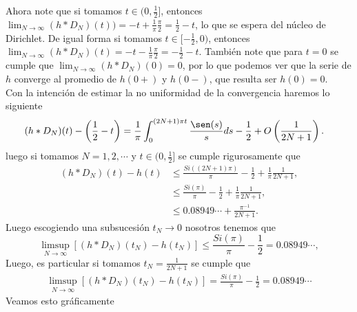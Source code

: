 Ahora note que si tomamos $t\in(0,\frac{1}{2}]$, entonces $\lim_{N \to \infty}(h*D_N)(t))=-t+\frac{1}{\pi}\frac{\pi}{2}=\frac{1}{2}-t$, lo que se espera del núcleo de Dirichlet. De igual forma si tomamos $t\in[-\frac{1}{2},0)$, entonces $\lim_{N \to \infty}(h*D_N)(t)=-t-\frac{1}{\pi}\frac{\pi}{2}=-\frac{1}{2}-t$. También note que para $t=0$ se cumple que $\lim_{N \to \infty}(h*D_{N})(0)=0$, por lo que podemos ver que la serie de $h$ converge al promedio de $h(0+)$ y $h(0-)$, que resulta ser $h(0)=0$.\\
Con la intención de estimar la no uniformidad de la convergencia haremos lo siguiente
\begin{align*}
  (h*D_N)(t)-\left( \frac{1}{2}-t \right)&=\frac{1}{\pi}\int_{0}^{(2N+1)\pi t}\frac{\sen(s)}{s}ds-\frac{1}{2}+O\left( \frac{1}{2N+1} \right).
\end{align*}
luego si tomamos $N=1,2,\cdots$ y $t\in (0,\frac{1}{2}]$ se cumple rigurosamente que 
\begin{align*}
  (h*D_N)(t)-h(t)&\leq \frac{Si((2N+1)\pi)}{\pi}-\frac{1}{2}+\frac{1}{\pi}\frac{1}{2N+1},\\
  &\leq \frac{Si(\pi)}{\pi}-\frac{1}{2}+\frac{1}{\pi}\frac{1}{2N+1},\\
  &\leq 0.08949\cdots+\frac{\pi^{-1}}{2N+1}.
\end{align*}
Luego escogiendo una subsucesión $t_N\to 0$ nosotros tenemos que
\begin{equation}\label{eq:cota}
  \limsup_{N\to\infty}\left[ (h*D_{N})(t_{N})-h(t_{N}) \right]\leq \frac{Si(\pi)}{\pi}-\frac{1}{2}=0.08949\cdots,
\end{equation}
Luego, es particular si tomamos $t_N=\frac{1}{2N+1}$ se cumple que
\begin{align*}
  \limsup_{N\to\infty}\left[ (h*D_{N})(t_N)-h(t_{N}) \right]=\frac{Si(\pi)}{\pi}-\frac{1}{2}=0.08949\cdots
\end{align*}
Veamos esto gráficamente
